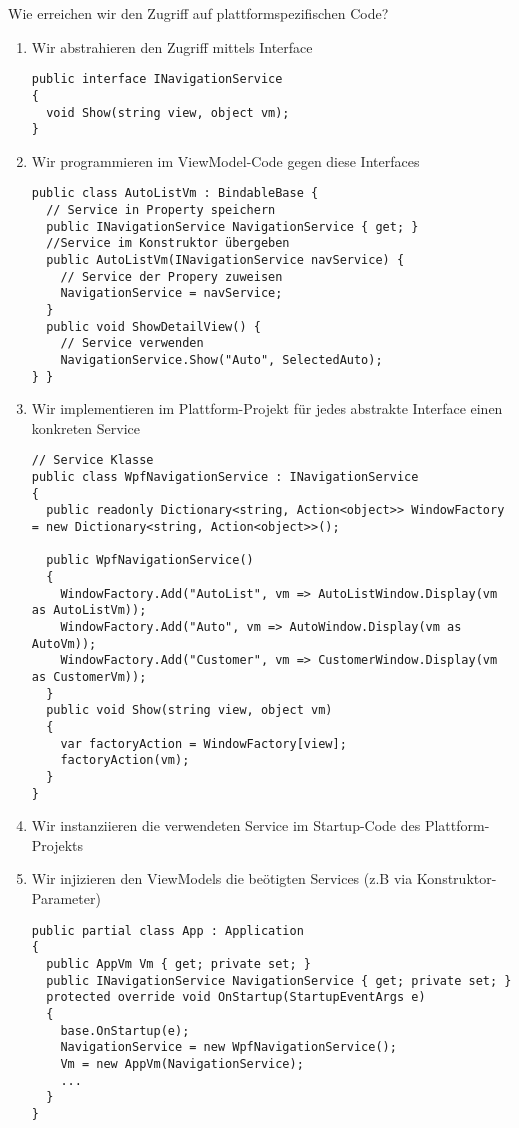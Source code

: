 Wie erreichen wir den Zugriff auf plattformspezifischen Code?
\begin{enumerate}
    \item Wir abstrahieren den Zugriff mittels Interface
\begin{lstlisting}
public interface INavigationService 
{ 
  void Show(string view, object vm); 
} 
\end{lstlisting}
    \item Wir programmieren im ViewModel-Code gegen diese Interfaces
\begin{lstlisting}
public class AutoListVm : BindableBase {
  // Service in Property speichern
  public INavigationService NavigationService { get; }
  //Service im Konstruktor übergeben
  public AutoListVm(INavigationService navService) { 
    // Service der Propery zuweisen
    NavigationService = navService;
  } 
  public void ShowDetailView() {
    // Service verwenden
    NavigationService.Show("Auto", SelectedAuto); 
} } 
\end{lstlisting}
    \item Wir implementieren im Plattform-Projekt für jedes abstrakte Interface einen konkreten Service
\begin{lstlisting}
// Service Klasse
public class WpfNavigationService : INavigationService 
{ 
  public readonly Dictionary<string, Action<object>> WindowFactory = new Dictionary<string, Action<object>>(); 
  
  public WpfNavigationService() 
  { 
    WindowFactory.Add("AutoList", vm => AutoListWindow.Display(vm as AutoListVm)); 
    WindowFactory.Add("Auto", vm => AutoWindow.Display(vm as AutoVm)); 
    WindowFactory.Add("Customer", vm => CustomerWindow.Display(vm as CustomerVm)); 
  } 
  public void Show(string view, object vm) 
  { 
    var factoryAction = WindowFactory[view];
    factoryAction(vm); 
  } 
} 
\end{lstlisting}
    \item Wir instanziieren die verwendeten Service im Startup-Code des Plattform-Projekts
    \item Wir injizieren den ViewModels die beötigten Services (z.B via Konstruktor-Parameter)
\begin{lstlisting}
public partial class App : Application 
{ 
  public AppVm Vm { get; private set; } 
  public INavigationService NavigationService { get; private set; } 
  protected override void OnStartup(StartupEventArgs e) 
  { 
    base.OnStartup(e); 
    NavigationService = new WpfNavigationService(); 
    Vm = new AppVm(NavigationService); 
    ... 
  }
} 
\end{lstlisting}
\end{enumerate}
